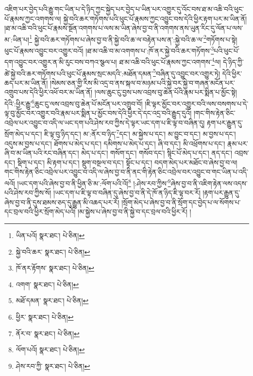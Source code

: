 འཇིག་པར་བྱེད་པའི་རྒྱུ་གང་ཡིན་པ་དེ་ཉིད་ཀྱང་སྐྱེད་པར་བྱེད་པ་ཡིན་པར་འགྱུར་དུ་འོང་བས་ཐ་མ་འཆི་བའི་ཕུང་པོ་རྣམས་ཀྱང་འགགས་ལ། སྐྱེ་བའི་ཆར་གཏོགས་པའི་ཕུང་པོ་རྣམས་ཀྱང་འབྱུང་བས་དེའི་ཕྱིར་རྟག་པར་མ་ཡིན་ནོ། །ཐ་མ་འཆི་བའི་ཕུང་པོ་རྣམས་སྔོན་འགགས་པ་ལས་མ་ཡིན་ཞེས་བྱ་བ་ནི་འགགས་ནས་ཡུན་རིང་དུ་ལོན་པ་ལས་མ་:ཡིན་པ།\footnote{ཡིན་པའོ།  སྣར་ཐང་།  པེ་ཅིན། } སྐྱེ་བའི་ཆར་གཏོགས་པ་ཞེས་བྱ་བ་ནི་སྐྱེ་བའི་ཆ་ལ་བརྟེན་པས་ན་:སྐྱེ་བའི་ཆ་ལ་\footnote{སྐྱེ་བའི་ཆར་  སྣར་ཐང་།  པེ་ཅིན། }གཏོགས་པ་སྟེ། ཕུང་པོ་རྣམས་འབྱུང་བར་འགྱུར་བའོ། །ཐ་མ་འཆི་བ་མ་འགགས་པ་:ཁོ་ནར་སྐྱེ་བའི་ཆར་གཏོགས་\footnote{ཁོ་ནར་རྟོགས་  སྣར་ཐང་།  པེ་ཅིན། }པའི་ཕུང་པོ་དག་འབྱུང་བར་འགྱུར་ན་མི་རུང་བས་བཀའ་སྩལ་པ། ཐ་མ་འཆི་བའི་ཕུང་པོ་རྣམས་ཀྱང་འགགས་\footnote{འགག་  སྣར་ཐང་།  པེ་ཅིན། }ལ། དེ་ཉིད་ཀྱི་ཚེ་སྐྱེ་བའི་ཆར་གཏོགས་པའི་ཕུང་པོ་རྣམས་སྲང་མདའི་:མཐོན་དམན་\footnote{མཐོ་དམན་  སྣར་ཐང་།  པེ་ཅིན། }བཞིན་དུ་འབྱུང་བར་འགྱུར་ཏེ། དེའི་ཕྱིར་ཆད་པར་མ་ཡིན་ནོ། །སེམས་ཅན་གྱི་རིས་མི་འདྲ་བ་ནས་སྐལ་བ་མཉམ་པའི་སྐྱེ་བར་སྐྱེ་བ་གཞན་མངོན་པར་འགྲུབ་པས་དེའི་ཕྱིར་འཕོ་བར་མ་ཡིན་ནོ། །ལས་ཆུང་ངུ་བྱས་པས་འབྲས་བུ་ཆེན་པོའི་རྣམ་པར་སྨིན་པ་མྱོང་སྟེ། དེའི་:ཕྱིར་རྒྱུ་\footnote{ཕྱིར་  སྣར་ཐང་།  པེ་ཅིན། }ཆུང་ངུ་ལས་འབྲས་བུ་ཆེན་པོ་མངོན་པར་འགྲུབ་བོ། །ཇི་ལྟར་མྱོང་བར་འགྱུར་བའི་ལས་བསགས་པ་དེ་ལྟ་བུ་མྱོང་བར་འགྱུར་བའི་རྣམ་པར་སྨིན་པ་མྱོང་བས་དེའི་ཕྱིར་དེ་དང་འདྲ་བའི་རྒྱུད་དུའོ། །གང་གིས་རྟེན་ཅིང་འབྲེལ་པར་འབྱུང་བ་འདི་ལ་ཡང་དག་པའི་ཤེས་རབ་ཀྱིས་དེ་ལྟར་ཡང་དག་པ་ཇི་ལྟ་བ་བཞིན་དུ། རྟག་པར་རྒྱུན་དུ་སྲོག་མེད་པ་དང་། ཇི་ལྟ་བུ་ཉིད་དང་། མ་:ནོར་བ་ཉིད་\footnote{ནོར་བ་  སྣར་ཐང་།  པེ་ཅིན། }དང་། མ་སྐྱེས་པ་དང་། མ་བྱུང་བ་དང་། མ་བྱས་པ་དང་། འདུས་མ་བྱས་པ་དང་། ཐོགས་པ་མེད་པ་དང་། དམིགས་པ་མེད་པ་དང་། ཞི་བ་དང་། མི་འཕྲོགས་པ་དང་། རྣམ་པར་ཞི་བ་མ་ཡིན་པའི་རང་བཞིན་དང་། མེད་པ་དང་། གསོག་དང་། གསོབ་དང་། སྙིང་པོ་མེད་པ་དང་། ནད་དང་། འབྲས་དང་། སྡིག་པ་དང་། མི་རྟག་པ་དང་། སྡུག་བསྔལ་བ་དང་། སྟོང་པ་དང་། བདག་མེད་པར་མཐོང་བ་ཞེས་བྱ་བ་ལ། གང་གིས་རྟེན་ཅིང་འབྲེལ་པར་འབྱུང་བ་འདི་ལ་ཞེས་བྱ་བ་ནི་ནང་གི་རྟེན་ཅིང་འབྲེལ་བར་འབྱུང་བ་གང་ཡིན་པ་འདི་ལའོ། །ཡང་དག་པའི་ཞེས་བྱ་བ་ནི་ཕྱིན་ཅི་མ་:ལོག་པའི་འོ།\footnote{ལོག་པའོ།  སྣར་ཐང་།  པེ་ཅིན། } །:ཤེས་རབ་ཀྱིས་\footnote{ཤེས་རབ་ཀྱི་  སྣར་ཐང་།  པེ་ཅིན། }ཞེས་བྱ་བ་ནི་འཇིག་རྟེན་ལས་འདས་པའི་ཤེས་རབ་ཀྱིས་སོ། །ཡང་དག་པ་ཇི་ལྟ་བ་བཞིན་དུ་ཞེས་བྱ་བ་ནི་དེ་ཁོ་ན་ཉིད་ཇི་ལྟ་བར་རོ། །རྟག་པར་རྒྱུན་དུ་ཞེས་བྱ་བ་ནི་དུས་ཐམས་ཅད་དུ་རྒྱུན་མི་འཆད་པར་རོ། །སྲོག་མེད་པ་ཞེས་བྱ་བ་ནི་སྲོག་དང་བྱེད་པ་ལ་སོགས་པ་དང་བྲལ་བའི་ཕྱིར་སྲོག་མེད་པའོ། །མ་སྐྱེས་པ་ཞེས་བྱ་བ་ནི་སྐྱེ་བ་དང་བྲལ་བའི་ཕྱིར་རོ། །
